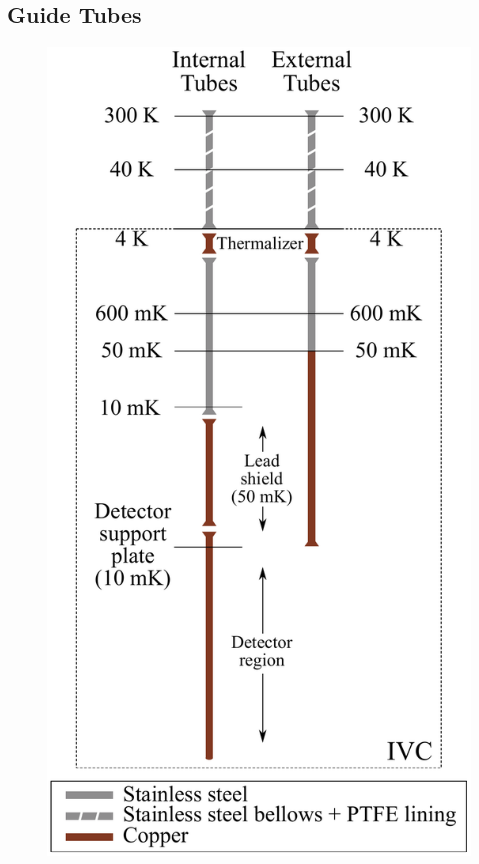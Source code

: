 \subsection{Guide Tubes}


\begin{figure}[htbp]
    \centering
    \includegraphics[height=0.4\paperheight]{Figures/thermal_coupling.pdf}

\end{figure}
